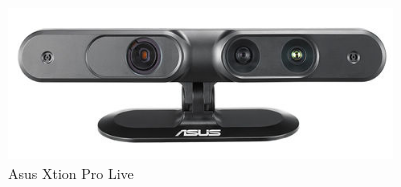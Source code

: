 \begin{figure}
	[h] \centering 
	\includegraphics[height=4cm]{figures/content/xtion.png} 
	\caption{Asus Xtion Pro Live}
	\label{fg:xtion} 
\end{figure}
